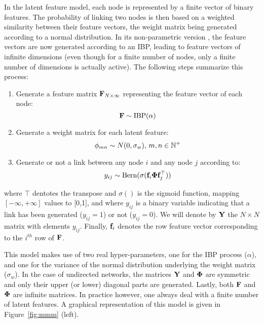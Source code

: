 In the latent feature model, each node is represented by a finite vector of binary features. The probability of linking two nodes is then based on a weighted similarity between their feature vectors, the weight matrix being generated according to a normal distribution. In its non-parametric version \ifm, the feature vectors are now generated according to an IBP, leading to feature vectors of infinite dimensions (even though for a finite number of nodes, only a finite number of dimensions is actually active). The following steps summarize this process:~\\
%
\begin{enumerate}
    \item Generate a feature matrix $\mathbf{F}_{N \times \infty}$ representing the feature vector of each node: \[\mathbf{F} \sim \mathrm{IBP}(\alpha)\]
\item Generate a weight matrix for each latent feature:\\
    \[\mathbf{\phi}_{mn} \sim N(0, \sigma_w), \, m,n \in \mathbb{N}^{+}\]
\item Generate or not a link between any node $i$ and any node $j$ according to: 
%
\begin{equation*}
y_{ij} \sim \mathrm{Bern}(\sigma(\mathbf{f}_{i} \mathbf{\Phi} \mathbf{f}_{j}^\top))
\end{equation*}
\end{enumerate}
%
where $\top$ dentotes the transpose and  $\sigma()$ is the sigmoid function, mapping $[-\infty, +\infty]$ values to [0,1], and where $y_{ij}$ is a binary variable indicating that a link has been generated ($y_{ij}=1$) or not ($y_{ij}=0$). We will denote by $\mathbf{Y}$ the $N \times N$ matrix with elements $y_{ij}$. Finally, $\mathbf{f}_{i}$ denotes the row feature vector corresponding to the $i^{th}$ row of $\mathbf{F}$.

This model makes use of two real hyper-parameters, one for the IBP process ($\alpha$), and one for the variance of the normal distribution underlying the weight matrix ($\sigma_w$). In the case of undirected networks, the matrices $\mathbf{Y}$ and $\mathbf{\Phi}$ are symmetric and only their upper (or lower) diagonal parts are generated. Lastly, both $\mathbf{F}$ and $\mathbf{\Phi}$ are infinite matrices. In practice however, one always deal with a finite number of latent features. A graphical representation of this model is given in Figure~\ref{fig:mmm} (left).~\\


